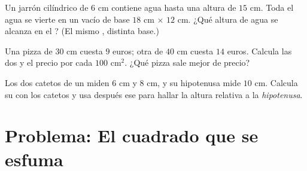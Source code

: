 \begin{exercise}[$\star\star$]\label{exo:g7:areas:10}
Un jarrón cilíndrico de  $6$ cm contiene agua hasta una altura de
$15$ cm. Toda el agua se vierte en un  vacío de base
$18$ cm $\times$ $12$ cm. ¿Qué altura de agua se alcanza en el
? (El mismo , distinta base.)
\end{exercise}

\begin{exercise}[$\star\star$]\label{exo:g7:areas:11}
Una pizza de  $30$ cm cuesta $9$ euros; otra de  $40$ cm
cuesta $14$ euros. Calcula las dos  y el precio por cada $100$
cm$^2$. ¿Qué pizza sale mejor de precio?
\end{exercise}

\begin{exercise}[$\star\star\star$]\label{exo:g7:areas:12}
Los dos catetos de un  miden $6$ cm y $8$ cm, y su
hipotenusa mide $10$ cm. Calcula su  con los catetos y usa después
ese  para hallar la altura relativa a la \emph{hipotenusa}.
\end{exercise}

\section{Problema: El cuadrado que se esfuma}

